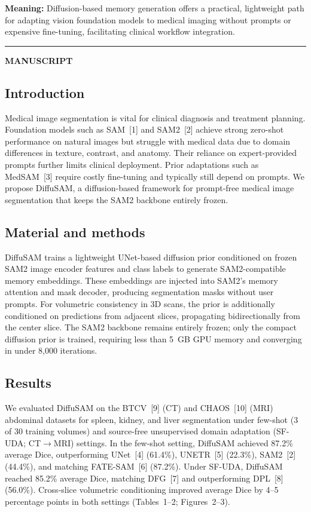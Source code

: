 \documentclass[11pt,a4paper]{article}
\begin{document}
\textbf{Meaning:}
Diffusion-based memory generation offers a practical, lightweight path for adapting vision foundation models to medical imaging without prompts or expensive fine-tuning, facilitating clinical workflow integration.

\bigskip
\hrule
\bigskip

{\large\bfseries MANUSCRIPT}

\subsection*{Introduction}
Medical image segmentation is vital for clinical diagnosis and treatment planning.
Foundation models such as SAM~[1] and SAM2~[2] achieve strong zero-shot performance on natural images but struggle with medical data due to domain differences in texture, contrast, and anatomy.
Their reliance on expert-provided prompts further limits clinical deployment.
Prior adaptations such as MedSAM~[3] require costly fine-tuning and typically still depend on prompts.
We propose DiffuSAM, a diffusion-based framework for prompt-free medical image segmentation that keeps the SAM2 backbone entirely frozen.

\subsection*{Material and methods}
DiffuSAM trains a lightweight UNet-based diffusion prior conditioned on frozen SAM2 image encoder features and class labels to generate SAM2-compatible memory embeddings.
These embeddings are injected into SAM2's memory attention and mask decoder, producing segmentation masks without user prompts.
For volumetric consistency in 3D scans, the prior is additionally conditioned on predictions from adjacent slices, propagating bidirectionally from the center slice.
The SAM2 backbone remains entirely frozen; only the compact diffusion prior is trained, requiring less than 5~GB GPU memory and converging in under 8,000 iterations.

\subsection*{Results}
We evaluated DiffuSAM on the BTCV~[9] (CT) and CHAOS~[10] (MRI) abdominal datasets for spleen, kidney, and liver segmentation under few-shot (3 of 30 training volumes) and source-free unsupervised domain adaptation (SF-UDA; CT$\to$MRI) settings.
In the few-shot setting, DiffuSAM achieved 87.2\% average Dice, outperforming UNet~[4] (61.4\%), UNETR~[5] (22.3\%), SAM2~[2] (44.4\%), and matching FATE-SAM~[6] (87.2\%).
Under SF-UDA, DiffuSAM reached 85.2\% average Dice, matching DFG~[7] and outperforming DPL~[8] (56.0\%).
Cross-slice volumetric conditioning improved average Dice by 4--5 percentage points in both settings (Tables~1--2; Figures~2--3).
\end{document}
